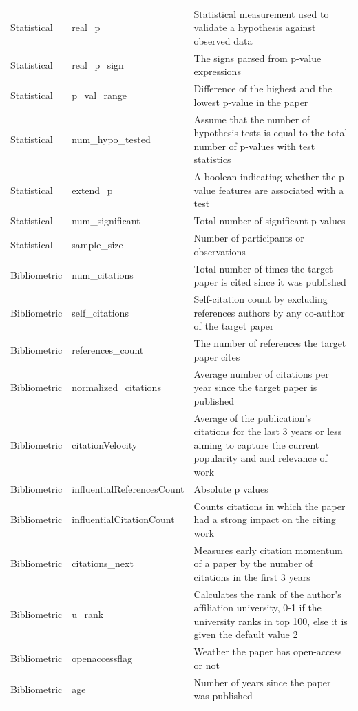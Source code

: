 \documentclass[
10pt, %
a4paper, %
oneside, %
headinclude,footinclude, %
BCOR5mm, %
]{scrartcl}
\begin{document}
\begin{longtable}[c]{|p{2cm}|p{4cm}|p{8cm}|}
 \hline
 \endfoot
\endlastfoot
Statistical & real\_p & Statistical measurement used to validate a hypothesis against observed data\\
Statistical & real\_p\_sign & The signs parsed from p-value expressions\\
Statistical & p\_val\_range & Difference of the highest and the lowest p-value in the paper\\
Statistical & num\_hypo\_tested & Assume that the number of hypothesis tests is equal to the total number of p-values with test statistics\\
Statistical & extend\_p & A boolean indicating whether the p-value features are associated with a test\\
Statistical & num\_significant & Total number of significant p-values \\
Statistical & sample\_size & Number of participants or observations\\
Bibliometric & num\_citations & Total number of times the target paper is cited since it was published\\
Bibliometric & self\_citations & Self-citation count by excluding references authors by any co-author of the target paper \\
Bibliometric & references\_count & The number of references the target paper cites\\
Bibliometric & normalized\_citations & Average number of citations per year since the target paper is published\\
Bibliometric & citationVelocity & Average of the publication's citations for the last 3 years or less aiming to capture the current popularity and and relevance of work\\
Bibliometric & influentialReferencesCount & Absolute p values\\
Bibliometric & influentialCitationCount & Counts citations in which the paper had a strong impact on the citing work\\
Bibliometric & citations\_next & Measures early citation momentum of a paper by the number of citations in the first 3 years\\
Bibliometric & u\_rank & Calculates the rank of the author's affiliation university, 0-1 if the university ranks in top 100, else it is given the default value 2 \\
Bibliometric & openaccessflag & Weather the paper has open-access or not\\
Bibliometric & age & Number of years since the paper was published\\

\end{longtable}
\end{document}
